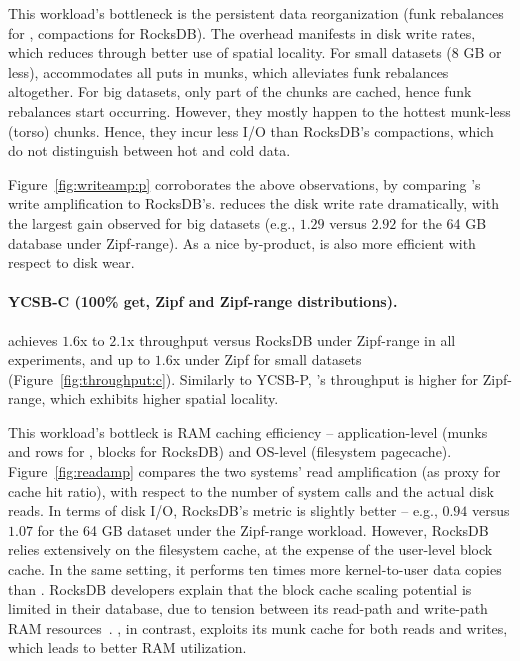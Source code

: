This workload's bottleneck is the persistent data reorganization 
(funk rebalances for \sys, compactions for RocksDB). The overhead
manifests in disk write rates, which \sys\/ reduces through better use of spatial locality. 
For small datasets (8 GB or less), \sys\/ accommodates all puts in munks, which alleviates 
funk rebalances altogether. For big datasets, only part of the chunks are cached, hence 
funk rebalances start occurring. However, they mostly happen to the hottest munk-less 
(torso) chunks. Hence, they incur less I/O than RocksDB's compactions, which do not 
distinguish between hot and cold data. 

Figure~\ref{fig:writeamp:p} corroborates the above observations, by comparing 
\sys's write amplification to RocksDB's. \sys\/ reduces the disk write rate dramatically, 
with the largest gain observed for big datasets (e.g., $1.29$ versus $2.92$ for the 64 GB 
database under Zipf-range). As a nice by-product, \sys\/ is also more 
efficient with respect to disk wear.  

\paragraph{YCSB-C (100\% get, Zipf and Zipf-range distributions).}  
\sys\/ achieves $1.6$x to $2.1$x throughput versus RocksDB under Zipf-range in all experiments, 
and up to $1.6$x under Zipf for small datasets (Figure~\ref{fig:throughput:c}). Similarly to YCSB-P, 
\sys's throughput is higher for Zipf-range, which exhibits higher spatial locality.  

This workload's bottleck is RAM caching efficiency -- application-level 
(munks and rows for \sys, blocks for RocksDB) and OS-level (filesystem pagecache). 
Figure~\ref{fig:readamp} compares the two systems' read amplification (as proxy 
for cache hit ratio), with respect to the number of system calls and the actual disk reads.  
In terms of disk I/O, RocksDB's metric is slightly better -- e.g., $0.94$ versus $1.07$
for the 64 GB dataset under the Zipf-range workload. However, RocksDB relies extensively 
on the filesystem cache, at the expense of the user-level block cache. In the same
setting, it performs ten times more kernel-to-user data copies than \sys.
RocksDB developers explain that the block cache scaling potential is limited in their
database, due to tension between its read-path and write-path RAM resources~\cite{RocksDB-default-blockcache-issue}. 
\sys, in contrast, exploits its munk cache for both reads and writes, which leads to better RAM utilization. 

